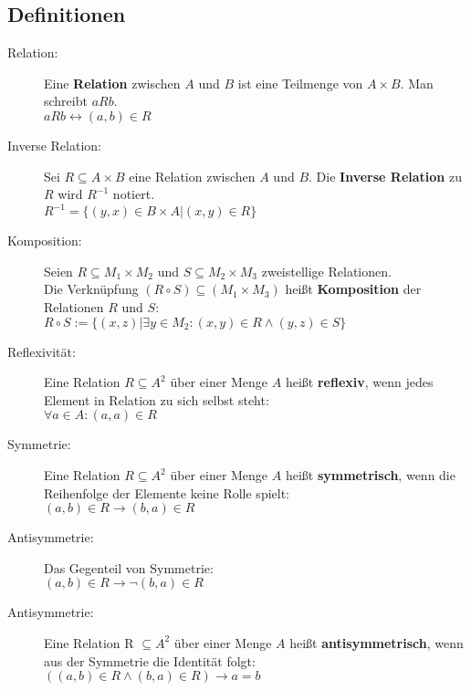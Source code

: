 \subsection*{Definitionen}
\vspace{-0.3cm}

\begin{description}
  \item [Relation:] 
    Eine \textbf{Relation} zwischen $A$ und $B$ ist eine Teilmenge von 
    $A \times B$. Man schreibt $aRb$.\\
    $aRb \leftrightarrow (a, b) \in R$

  \item [Inverse Relation:] 
    Sei $R \subseteq A \times B$ eine Relation zwischen $A$ und $B$.
    Die \textbf{Inverse Relation} zu $R$ wird $R^{-1}$ notiert.\\
    $R^{-1} = \{(y,x) \in B \times A | (x,y) \in R\}$

  \item [Komposition:]
    Seien $R \subseteq M_1 \times M_2$ und $S \subseteq M_2 \times M_3$ 
    zweistellige Relationen.\\
    Die Verknüpfung $(R \circ S) \subseteq (M_1 \times M_3)$ heißt 
    \textbf{Komposition} der Relationen $R$ und $S$: \\
    $R \circ S := \{(x,z) | \exists y \in M_2 : (x,y) \in R \wedge (y,z) \in S\}$

  \item [Reflexivität:]
    Eine Relation $R \subseteq A^2$ über einer Menge $A$ heißt \textbf{reflexiv}, 
    wenn jedes Element in Relation zu sich selbst steht:\\
    $\forall a \in A : (a,a) \in R$

  \item [Symmetrie:]
    Eine Relation $R \subseteq A^2$ über einer Menge $A$ heißt 
    \textbf{symmetrisch}, wenn die Reihenfolge der Elemente keine Rolle spielt:\\
    $(a,b) \in R \rightarrow (b,a) \in R$
  
  \item [Antisymmetrie:]
    Das Gegenteil von Symmetrie:\\
    $(a,b) \in R \rightarrow \neg(b,a) \in R$

  \item [Antisymmetrie:] 
    Eine Relation R $\subseteq A^2$ über einer Menge $A$ heißt 
    \textbf{antisymmetrisch}, wenn aus der Symmetrie die Identität folgt: \\
    $((a,b) \in R \wedge (b,a) \in R) \rightarrow a = b$


\end{description}
